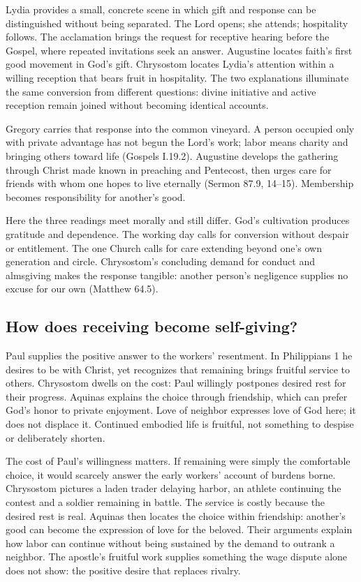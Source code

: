 Lydia provides a small, concrete scene in which gift and response can be distinguished without being separated. The Lord opens; she attends; hospitality follows. The acclamation brings the request for receptive hearing before the Gospel, where repeated invitations seek an answer. Augustine locates faith's first good movement in God's gift. Chrysostom locates Lydia's attention within a willing reception that bears fruit in hospitality. The two explanations illuminate the same conversion from different questions: divine initiative and active reception remain joined without becoming identical accounts.

Gregory carries that response into the common vineyard. A person occupied only with private advantage has not begun the Lord's work; labor means charity and bringing others toward life (Gospels I.19.2). Augustine develops the gathering through Christ made known in preaching and Pentecost, then urges care for friends with whom one hopes to live eternally (Sermon 87.9, 14--15). Membership becomes responsibility for another's good.

Here the three readings meet morally and still differ. God's cultivation produces gratitude and dependence. The working day calls for conversion without despair or entitlement. The one Church calls for care extending beyond one's own generation and circle. Chrysostom's concluding demand for conduct and almsgiving makes the response tangible: another person's negligence supplies no excuse for our own (Matthew 64.5).

\subsection{How does receiving become self-giving?}
Paul supplies the positive answer to the workers' resentment. In Philippians 1 he desires to be with Christ, yet recognizes that remaining brings fruitful service to others. Chrysostom dwells on the cost: Paul willingly postpones desired rest for their progress. Aquinas explains the choice through friendship, which can prefer God's honor to private enjoyment. Love of neighbor expresses love of God here; it does not displace it. Continued embodied life is fruitful, not something to despise or deliberately shorten.

The cost of Paul's willingness matters. If remaining were simply the comfortable choice, it would scarcely answer the early workers' account of burdens borne. Chrysostom pictures a laden trader delaying harbor, an athlete continuing the contest and a soldier remaining in battle. The service is costly because the desired rest is real. Aquinas then locates the choice within friendship: another's good can become the expression of love for the beloved. Their arguments explain how labor can continue without being sustained by the demand to outrank a neighbor. The apostle's fruitful work supplies something the wage dispute alone does not show: the positive desire that replaces rivalry.

